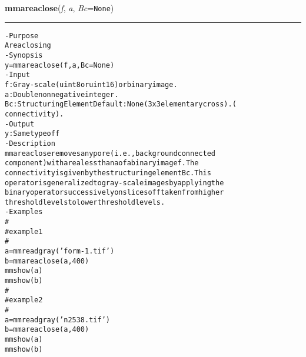     \label{multireg:num_pymorph:mmareaclose}
    \vspace{0.5ex}

    \begin{boxedminipage}{\textwidth}

    \raggedright \textbf{mmareaclose}(\textit{f}, \textit{a}, \textit{Bc}=\texttt{N\-o\-n\-e\-})

    \vspace{-1.5ex}

    \rule{\textwidth}{0.5\fboxrule}
\begin{alltt}
- Purpose
    Area closing
- Synopsis
    y = mmareaclose(f, a, Bc=None)
- Input
    f:  Gray-scale (uint8 or uint16) or binary image.
    a:  Double non negative integer.
    Bc: Structuring Element Default: None (3x3 elementary cross). (
        connectivity).
- Output
    y: Same type of f
- Description
    mmareaclose removes any pore (i.e., background connected
    component) with area less than a of a binary image f . The
    connectivity is given by the structuring element Bc . This
    operator is generalized to gray-scale images by applying the
    binary operator successively on slices of f taken from higher
    threshold levels to lower threshold levels.
- Examples
    \#
    \#   example 1
    \#
    a=mmreadgray('form-1.tif')
    b=mmareaclose(a,400)
    mmshow(a)
    mmshow(b)
    \#
    \#   example 2
    \#
    a=mmreadgray('n2538.tif')
    b=mmareaclose(a,400)
    mmshow(a)
    mmshow(b)\end{alltt}

    \vspace{1ex}

    \end{boxedminipage}

    \label{multireg:num_pymorph:mmareaopen}
    \vspace{0.5ex}

